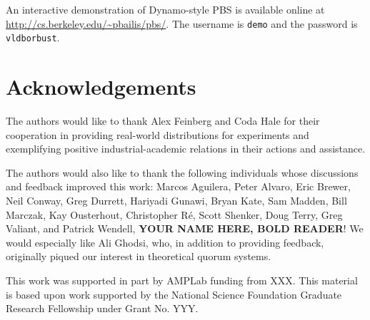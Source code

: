 \documentclass{vldb}
\begin{document}
An interactive demonstration of Dynamo-style PBS is available online at \url{http://cs.berkeley.edu/~pbailis/pbs/}.  The username is \texttt{demo} and the password is \texttt{vldborbust}.

\section*{Acknowledgements}

The authors would like to thank Alex Feinberg and Coda Hale for their
cooperation in providing real-world distributions for experiments and
exemplifying positive industrial-academic relations in their actions
and assistance.

The authors would also like to thank the following individuals whose
discussions and feedback improved this work: Marcos Aguilera, Peter
Alvaro, Eric Brewer, Neil Conway, Greg Durrett, Hariyadi Gunawi, Bryan
Kate, Sam Madden, Bill Marczak, Kay Ousterhout, Christopher R\'e,
Scott Shenker, Doug Terry, Greg Valiant, and Patrick Wendell,
\textbf{YOUR NAME HERE, BOLD READER}!  We would especially like Ali
Ghodsi, who, in addition to providing feedback, originally piqued our
interest in theoretical quorum systems.

This work was supported in part by AMPLab funding from XXX.  This
material is based upon work supported by the National Science
Foundation Graduate Research Fellowship under Grant No. YYY.

\balance

\footnotesize


\end{document}
